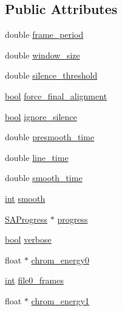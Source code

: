 \subsection*{Public Attributes}
\begin{DoxyCompactItemize}
\item 
double \hyperlink{class_scorealign_a47f51125e3cb2018d1baa349be161be7}{frame\+\_\+period}
\item 
double \hyperlink{class_scorealign_a303f57cd6200fd229f7f92fb0bfa95bc}{window\+\_\+size}
\item 
double \hyperlink{class_scorealign_ac8da1d180b5d33a6f4bda884acaa2a23}{silence\+\_\+threshold}
\item 
\hyperlink{mac_2config_2i386_2lib-src_2libsoxr_2soxr-config_8h_abb452686968e48b67397da5f97445f5b}{bool} \hyperlink{class_scorealign_a46b492352566a6b58134515e77b61801}{force\+\_\+final\+\_\+alignment}
\item 
\hyperlink{mac_2config_2i386_2lib-src_2libsoxr_2soxr-config_8h_abb452686968e48b67397da5f97445f5b}{bool} \hyperlink{class_scorealign_a604edf21b85319e10179bf5140d1e09b}{ignore\+\_\+silence}
\item 
double \hyperlink{class_scorealign_abf993742219359f789e1695b546cda87}{presmooth\+\_\+time}
\item 
double \hyperlink{class_scorealign_a0e8480364897c190afc0c7fd432a78f7}{line\+\_\+time}
\item 
double \hyperlink{class_scorealign_ab2421e375fa06931019107530ef0362d}{smooth\+\_\+time}
\item 
\hyperlink{xmltok_8h_a5a0d4a5641ce434f1d23533f2b2e6653}{int} \hyperlink{class_scorealign_ad049e8da9635fa284dadb6d17cd82bf2}{smooth}
\item 
\hyperlink{class_s_a_progress}{S\+A\+Progress} $\ast$ \hyperlink{class_scorealign_a3fa5103411223026f9785f896c8f9572}{progress}
\item 
\hyperlink{mac_2config_2i386_2lib-src_2libsoxr_2soxr-config_8h_abb452686968e48b67397da5f97445f5b}{bool} \hyperlink{class_scorealign_af1e35fb2a5a516e2cb77c19b7344b8ff}{verbose}
\item 
float $\ast$ \hyperlink{class_scorealign_a65e1070af091985304c02797ce210170}{chrom\+\_\+energy0}
\item 
\hyperlink{xmltok_8h_a5a0d4a5641ce434f1d23533f2b2e6653}{int} \hyperlink{class_scorealign_a43bab7477ee687ed17d676a81c3e9ced}{file0\+\_\+frames}
\item 
float $\ast$ \hyperlink{class_scorealign_ac094f1c6ed01fb8f9988bec933208bde}{chrom\+\_\+energy1}

\end{DoxyCompactItemize}
